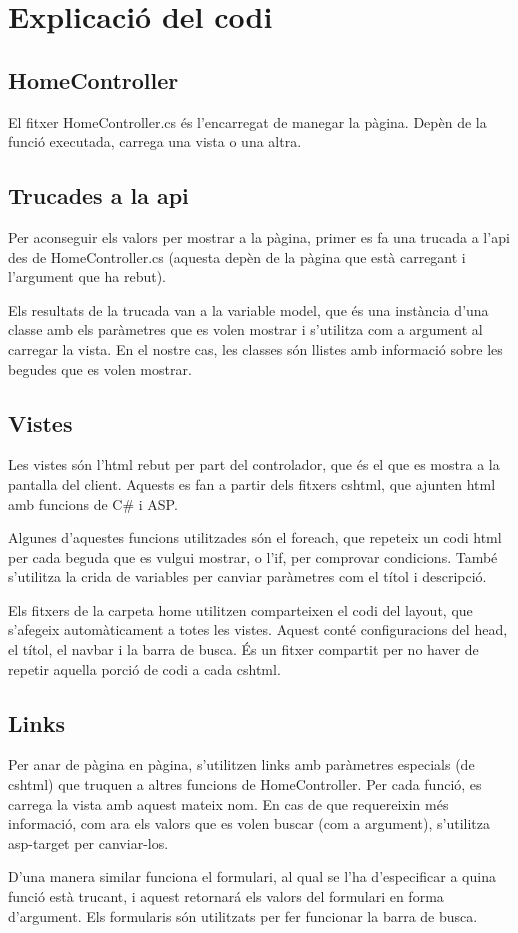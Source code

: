 \section{Explicaci\'o del codi}

\subsection{HomeController}
El fitxer HomeController.cs \'es l'encarregat de manegar la p\`agina.
Dep\`en de la funci\'o executada, carrega una vista o una altra.


\subsection{Trucades a la api}
Per aconseguir els valors per mostrar a la p\`agina,
primer es fa una trucada a l'api des de HomeController.cs
(aquesta dep\`en de la p\`agina que est\`a carregant i l'argument que ha rebut).

Els resultats de la trucada van a la variable model,
que \'es una inst\`ancia d'una classe amb els par\`ametres que es volen mostrar
i s'utilitza com a argument al carregar la vista.
En el nostre cas, les classes s\'on llistes amb informaci\'o sobre
les begudes que es volen mostrar.


\subsection{Vistes}
Les vistes s\'on l'html rebut per part del controlador,
que \'es el que es mostra a la pantalla del client.
Aquests es fan a partir dels fitxers cshtml,
que ajunten html amb funcions de C\# i ASP.

Algunes d'aquestes funcions utilitzades s\'on el foreach,
que repeteix un codi html per cada beguda que es vulgui mostrar,
o l'if, per comprovar condicions.
Tamb\'e s'utilitza la crida de variables per canviar par\`ametres com el t\'itol i descripci\'o.

Els fitxers de la carpeta home utilitzen comparteixen el codi del layout,
que s'afegeix autom\`aticament a totes les vistes.
Aquest cont\'e configuracions del head, el t\'itol, el navbar i la barra de busca.
\'Es un fitxer compartit per no haver de repetir aquella porci\'o de codi a cada cshtml.


\subsection{Links}
Per anar de p\`agina en p\`agina,
s'utilitzen links amb par\`ametres especials (de cshtml)
que truquen a altres funcions de HomeController.
Per cada funci\'o, es carrega la vista amb aquest mateix nom.
En cas de que requereixin m\'es informaci\'o,
com ara els valors que es volen buscar (com a argument),
s'utilitza asp-target per canviar-los.

D'una manera similar funciona el formulari,
al qual se l'ha d'especificar a quina funci\'o est\`a trucant,
i aquest retornar\'a els valors del formulari en forma d'argument.
Els formularis s\'on utilitzats per fer funcionar la barra de busca.
